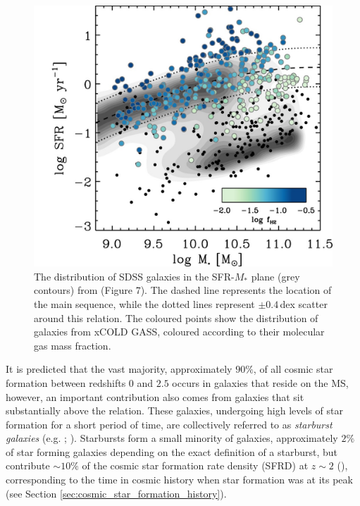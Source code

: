 \begin{figure}
    \centering
	\includegraphics[width=0.75\columnwidth]{Figures/saintonge_ms.jpg}
	\caption{The distribution of SDSS galaxies in the SFR-$M_*$ plane (grey contours) from \citealt{Saintonge_2017} (Figure 7). The dashed line represents the location of the main sequence, while the dotted lines represent $\pm0.4\,$dex scatter around this relation. The coloured points show the distribution of galaxies from xCOLD GASS, coloured according to their molecular gas mass fraction.}
	\label{fig:star_forming_main_sequence}
\end{figure}

It is predicted that the vast majority, approximately $90\%$, of all cosmic star formation between redshifts $0$ and $2.5$ occurs in galaxies that reside on the MS, however, an important contribution also comes from galaxies that sit substantially above the relation. These galaxies, undergoing high levels of star formation for a short period of time, are collectively referred to as \textit{starburst galaxies} (e.g. \citealt{Muxlow_2006}; \citealt{Rinaldi_2022}). Starbursts form a small minority of galaxies, approximately $2\%$ of star forming galaxies depending on the exact definition of a starburst, but contribute $\sim 10\%$ of the cosmic star formation rate density (SFRD) at $z \sim 2$ (\citealt{Rodighiero_2011}), corresponding to the time in cosmic history when star formation was at its peak (see Section \ref{sec:cosmic_star_formation_history}).

